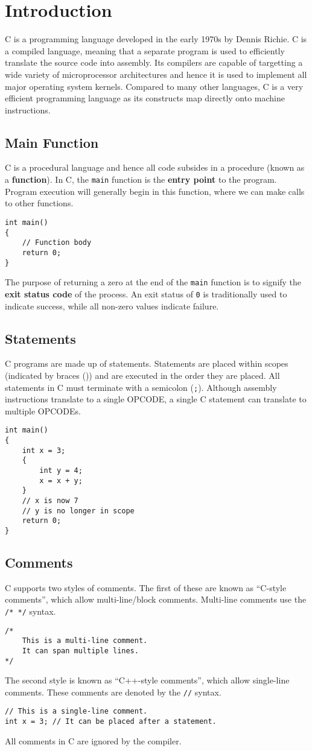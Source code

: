\documentclass{report}
\begin{document}
\chapter{Introduction}
C is a programming language developed in the early 1970s by Dennis
Richie. C is a compiled language, meaning that a separate program is
used to efficiently translate the source code into assembly. Its
compilers are capable of targetting a wide variety of microprocessor
architectures and hence it is used to implement all major operating
system kernels. Compared to many other languages, C is a very efficient
programming language as its constructs map directly onto machine
instructions.
\section{Main Function}
C is a procedural language and hence all code subsides in a procedure
(known as a \textbf{function}). In C, the \texttt{main} function
is the \textbf{entry point} to the program. Program execution will
generally begin in this function, where we can make calls to other
functions.
\begin{verbatim}
int main()
{
    // Function body
    return 0;
}
\end{verbatim}
The purpose of returning a zero at the end of the \texttt{main}
function is to signify the \textbf{exit status code} of the process. An
exit status of \texttt{0} is traditionally used to indicate
success, while all non-zero values indicate failure.
\section{Statements}
C programs are made up of statements. Statements are placed within
scopes (indicated by braces (\texttt{{}})) and are executed in
the order they are placed. All statements in C must terminate with a
semicolon (\texttt{;}). Although assembly instructions translate
to a single OPCODE, a single C statement can translate to multiple
OPCODEs.
\begin{verbatim}
int main()
{
    int x = 3;
    {
        int y = 4;
        x = x + y;
    }
    // x is now 7
    // y is no longer in scope
    return 0;
}
\end{verbatim}
\section{Comments}
C supports two styles of comments. The first of these are known as
``C-style comments'', which allow multi-line/block comments. Multi-line
comments use the \texttt{/* */} syntax.
\begin{verbatim}
/*
    This is a multi-line comment.
    It can span multiple lines.
*/
\end{verbatim}
The second style is known as ``C++-style comments'', which allow
single-line comments. These comments are denoted by the
\texttt{//} syntax.
\begin{verbatim}
// This is a single-line comment.
int x = 3; // It can be placed after a statement.
\end{verbatim}
All comments in C are ignored by the compiler.
\end{document}
